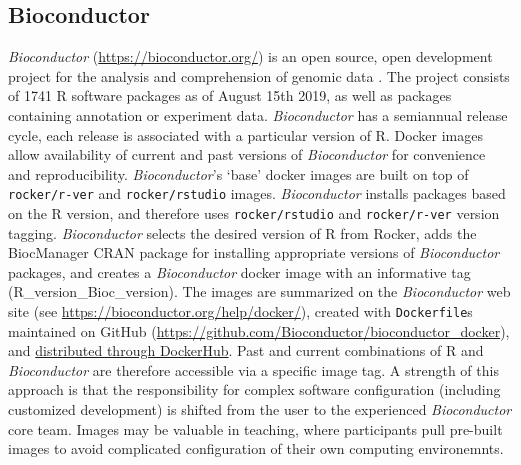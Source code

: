 \hypertarget{bioconductor}{%
\subsection{Bioconductor}\label{bioconductor}}

\label{bioc}

\emph{Bioconductor} (\url{https://bioconductor.org/}) is an open source,
open development project for the analysis and comprehension of genomic
data \citep{gentleman_bioconductor_2004}. The project consists of 1741 R
software packages as of August 15th 2019, as well as packages containing
annotation or experiment data. \emph{Bioconductor} has a semiannual
release cycle, each release is associated with a particular version of
R. Docker images allow availability of current and past versions of
\emph{Bioconductor} for convenience and reproducibility.
\emph{Bioconductor}'s `base' docker images are built on top of
\texttt{rocker/r-ver} and \texttt{rocker/rstudio} images.
\emph{Bioconductor} installs packages based on the R version, and
therefore uses \texttt{rocker/rstudio} and \texttt{rocker/r-ver} version
tagging. \emph{Bioconductor} selects the desired version of R from
Rocker, adds the BiocManager CRAN package for installing appropriate
versions of \emph{Bioconductor} packages, and creates a
\emph{Bioconductor} docker image with an informative tag
(R\_version\_Bioc\_version). The images are summarized on the
\emph{Bioconductor} web site (see
\url{https://bioconductor.org/help/docker/}), created with
\texttt{Dockerfile}s maintained on GitHub
(\url{https://github.com/Bioconductor/bioconductor_docker}), and
\href{https://hub.docker.com/u/bioconductor}{distributed through
DockerHub}. Past and current combinations of R and \emph{Bioconductor}
are therefore accessible via a specific image tag. A strength of this
approach is that the responsibility for complex software configuration
(including customized development) is shifted from the user to the
experienced \emph{Bioconductor} core team. Images may be valuable in
teaching, where participants pull pre-built images to avoid complicated
configuration of their own computing environemnts.

